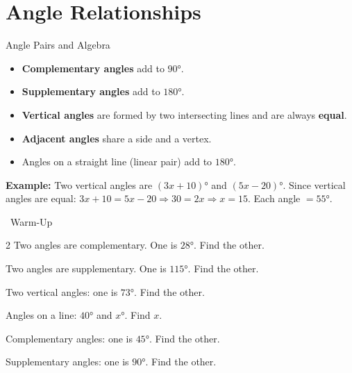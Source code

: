 \section{Angle Relationships}

\begin{quickReview}{Angle Pairs and Algebra}
\begin{itemize}[leftmargin=*]
    \item \textbf{Complementary angles} add to $90°$.
    \item \textbf{Supplementary angles} add to $180°$.
    \item \textbf{Vertical angles} are formed by two intersecting lines and are always \textbf{equal}.
    \item \textbf{Adjacent angles} share a side and a vertex.
    \item Angles on a straight line (linear pair) add to $180°$.
\end{itemize}

\medskip
\textbf{Example:} Two vertical angles are $(3x + 10)°$ and $(5x - 20)°$. Since vertical angles are equal: $3x + 10 = 5x - 20 \Rightarrow 30 = 2x \Rightarrow x = 15$. Each angle $= 55°$.
\end{quickReview}

\begin{practiceBox}[funGreen]{\faSun~Warm-Up}


\begin{multicols}{2}
\prob Two angles are complementary. One is $28°$. Find the other. \answerBlank[2cm]

\prob Two angles are supplementary. One is $115°$. Find the other. \answerBlank[2cm]

\prob Two vertical angles: one is $73°$. Find the other. \answerBlank[2cm]

\prob Angles on a line: $40°$ and $x°$. Find $x$. \answerBlank[2cm]

\prob Complementary angles: one is $45°$. Find the other. \answerBlank[2cm]

\prob Supplementary angles: one is $90°$. Find the other. \answerBlank[2cm]
\end{multicols}
\end{practiceBox}

